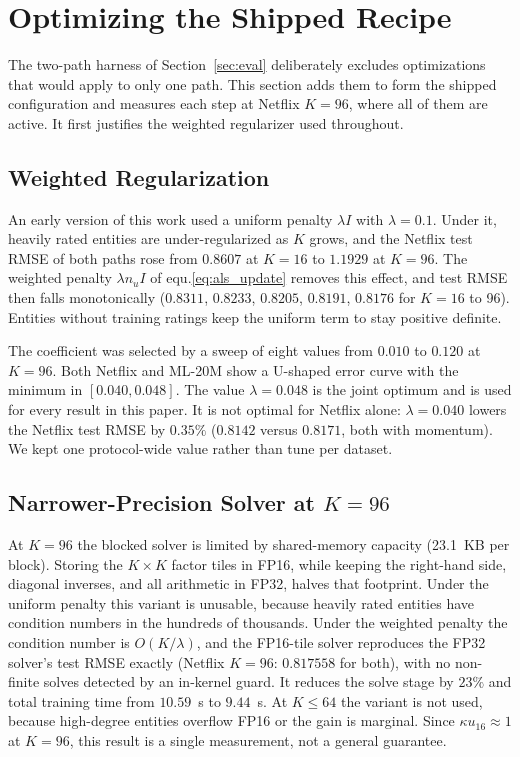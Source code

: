 \section{Optimizing the Shipped Recipe}
\label{sec:extended}

The two-path harness of Section~\ref{sec:eval} deliberately excludes optimizations that would apply to only one path. This section adds them to form the shipped configuration and measures each step at Netflix $K=96$, where all of them are active. It first justifies the weighted regularizer used throughout.

\subsection{Weighted Regularization}
\label{ssec:weightedlambda}

An early version of this work used a uniform penalty $\lambda I$ with $\lambda = 0.1$. Under it, heavily rated entities are under-regularized as $K$ grows, and the Netflix test RMSE of both paths rose from $0.8607$ at $K=16$ to $1.1929$ at $K=96$. The weighted penalty $\lambda n_u I$ of equ.\eqref{eq:als_update} removes this effect, and test RMSE then falls monotonically ($0.8311$, $0.8233$, $0.8205$, $0.8191$, $0.8176$ for $K = 16$ to 96). Entities without training ratings keep the uniform term to stay positive definite.

The coefficient was selected by a sweep of eight values from $0.010$ to $0.120$ at $K=96$. Both Netflix and ML-20M show a U-shaped error curve with the minimum in $[0.040, 0.048]$. The value $\lambda = 0.048$ is the joint optimum and is used for every result in this paper. It is not optimal for Netflix alone: $\lambda = 0.040$ lowers the Netflix test RMSE by $0.35\%$ ($0.8142$ versus $0.8171$, both with momentum). We kept one protocol-wide value rather than tune per dataset.

\subsection{Narrower-Precision Solver at $K=96$}
\label{ssec:fp16solver}

At $K=96$ the blocked solver is limited by shared-memory capacity (23.1~KB per block). Storing the $K \times K$ factor tiles in FP16, while keeping the right-hand side, diagonal inverses, and all arithmetic in FP32, halves that footprint. Under the uniform penalty this variant is unusable, because heavily rated entities have condition numbers in the hundreds of thousands. Under the weighted penalty the condition number is $O(K/\lambda)$, and the FP16-tile solver reproduces the FP32 solver's test RMSE exactly (Netflix $K=96$: $0.817558$ for both), with no non-finite solves detected by an in-kernel guard. It reduces the solve stage by $23\%$ and total training time from $10.59$~s to $9.44$~s. At $K \le 64$ the variant is not used, because high-degree entities overflow FP16 or the gain is marginal. Since $\kappa u_{16} \approx 1$ at $K=96$, this result is a single measurement, not a general guarantee.

